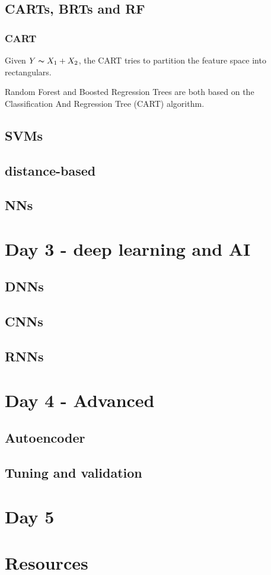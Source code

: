 \documentclass[a4paper,twoside]{tufte-book}\usepackage[]{graphicx}\usepackage[]{color}
\begin{document}
\section{CARTs, BRTs and RF}

\subsection{CART}
Given $Y \thicksim X_1 + X_2$, the CART tries to partition the feature space into rectangulars.


%
Random Forest \citep[RF,][]{Breiman2001a} and Boosted Regression Trees \citep[BRT,][]{Friedman2001} are both based on the Classification And Regression Tree (CART) algorithm.
%

\section{SVMs}

\section{distance-based}


\section{NNs}


\chapter{Day 3 - deep learning and AI}

\section{DNNs}

\section{CNNs}

\section{RNNs}

\chapter{Day 4 - Advanced}

\section{Autoencoder}

\section{Tuning and validation}


\chapter{Day 5}





\chapter{Resources}




\end{document}
